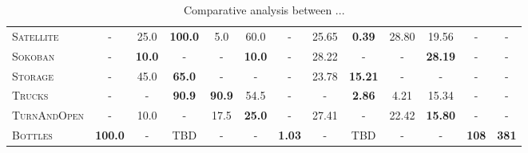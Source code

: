 \documentclass[11pt,landscape]{article}
\begin{document}
\begin{table*}[tb]
{\begin{tabular}{|l||ccccc||ccccc||c||c||}
\textsc{Satellite}&-&25.0&\textbf{100.0}&5.0&60.0&-&25.65&\textbf{0.39}&28.80&19.56&-&-\\
\textsc{Sokoban}&-&\textbf{10.0}&-&-&\textbf{10.0}&-&28.22&-&-&\textbf{28.19}&-&-\\
\textsc{Storage}&-&45.0&\textbf{65.0}&-&-&-&23.78&\textbf{15.21}&-&-&-&-\\
\textsc{Trucks}&-&-&\textbf{90.9}&\textbf{90.9}&54.5&-&-&\textbf{2.86}&4.21&15.34&-&-\\
\textsc{TurnAndOpen}&-&10.0&-&17.5&\textbf{25.0}&-&27.41&-&22.42&\textbf{15.80}&-&-\\
\textsc{Bottles}&\textbf{100.0}&-&TBD&-&-&\textbf{1.03}&-&TBD&-&-&\textbf{108}&\textbf{381}
\\\hline

        \end{tabular}}
        \caption{Comparative analysis between ...}
        \label{tab:experiments}
        \end{table*}
        
\end{document}
